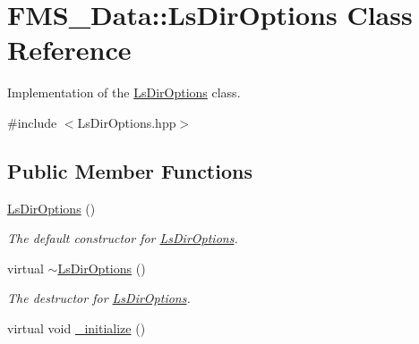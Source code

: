 \hypertarget{classFMS__Data_1_1LsDirOptions}{
\section{FMS\_\-Data::LsDirOptions Class Reference}
\label{classFMS__Data_1_1LsDirOptions}
}


Implementation of the \hyperlink{classFMS__Data_1_1LsDirOptions}{LsDirOptions} class.  




{\ttfamily \#include $<$LsDirOptions.hpp$>$}

\subsection*{Public Member Functions}
\begin{DoxyCompactItemize}
\item 
\hypertarget{classFMS__Data_1_1LsDirOptions_af2c61816d0f590ce118af59fb3a2f556}{
\hyperlink{classFMS__Data_1_1LsDirOptions_af2c61816d0f590ce118af59fb3a2f556}{LsDirOptions} ()}
\label{classFMS__Data_1_1LsDirOptions_af2c61816d0f590ce118af59fb3a2f556}

\begin{DoxyCompactList}\small\item\em The default constructor for \hyperlink{classFMS__Data_1_1LsDirOptions}{LsDirOptions}. \item\end{DoxyCompactList}\item 
\hypertarget{classFMS__Data_1_1LsDirOptions_a55fe5cac0de71212ebb58900b3a0f253}{
virtual \hyperlink{classFMS__Data_1_1LsDirOptions_a55fe5cac0de71212ebb58900b3a0f253}{$\sim$LsDirOptions} ()}
\label{classFMS__Data_1_1LsDirOptions_a55fe5cac0de71212ebb58900b3a0f253}

\begin{DoxyCompactList}\small\item\em The destructor for \hyperlink{classFMS__Data_1_1LsDirOptions}{LsDirOptions}. \item\end{DoxyCompactList}\item 
\hypertarget{classFMS__Data_1_1LsDirOptions_afc31d2b86017fc278996145d128a0c21}{
virtual void \hyperlink{classFMS__Data_1_1LsDirOptions_afc31d2b86017fc278996145d128a0c21}{\_\-initialize} ()}
\label{classFMS__Data_1_1LsDirOptions_afc31d2b86017fc278996145d128a0c21}


\end{DoxyCompactItemize}
